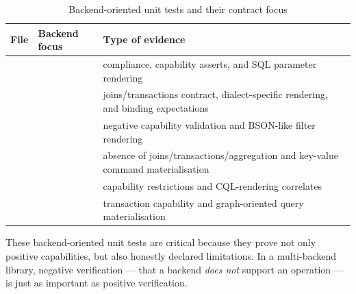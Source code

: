 \begin{table}[H]
\centering
\small
\caption{Backend-oriented unit tests and their contract focus}
\label{tab:verification_unit_connectors}
\begin{tabularx}{\textwidth}{L{3.4cm}L{3.1cm}Z}
\toprule
\textbf{File} & \textbf{Backend focus} & \textbf{Type of evidence} \\
\midrule
{} &  &  compliance, capability asserts, and SQL parameter rendering \\
 &  & joins/transactions contract, dialect-specific rendering, and binding expectations \\
 &  & negative capability validation and BSON-like filter rendering \\
 &  & absence of joins/transactions/aggregation and key-value command materialisation \\
 &  & capability restrictions and CQL-rendering correlates \\
 &  & transaction capability and graph-oriented query materialisation \\
\bottomrule
\end{tabularx}
\end{table}

These backend-oriented unit tests are critical because they prove not only positive capabilities, but also honestly declared limitations. In a multi-backend library, negative verification --- that a backend \emph{does not} support an operation --- is just as important as positive verification.

